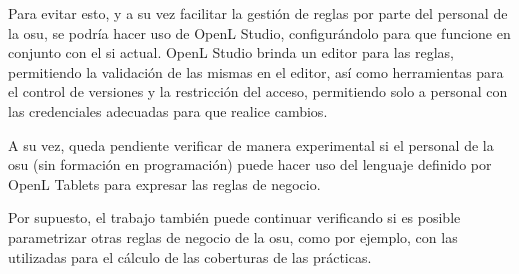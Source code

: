 Para evitar esto, y a su vez facilitar la gestión de reglas por parte del personal de la \acrshort{osu}, se podría hacer uso de OpenL Studio, configurándolo para que funcione en conjunto con el \acrshort{si} actual. 
OpenL Studio brinda un editor para las reglas, permitiendo la validación de las mismas en el editor, así como herramientas para el control de versiones y la restricción del acceso, permitiendo solo a personal con las credenciales adecuadas para que realice cambios.

A su vez, queda pendiente verificar de manera experimental si el personal de la \acrshort{osu} (sin formación en programación) puede hacer uso del lenguaje definido por OpenL Tablets para expresar las reglas de negocio. 

Por supuesto, el trabajo también puede continuar verificando si es posible parametrizar otras reglas de negocio de la \acrshort{osu}, como por ejemplo, con las utilizadas para el cálculo de las coberturas de las prácticas.
